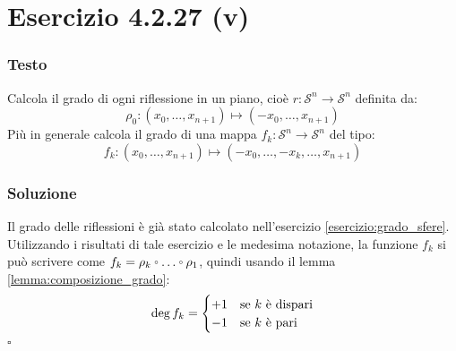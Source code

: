 \documentclass[10pt, toc=sectionentrywithdots]{scrartcl}
\newcommand{\Sph}[1][]{\mathcal{S}^#1}
\let\latexcirc=\circ
\newcommand{\ccirc}{\mathbin{\mathchoice
  {\xcirc\scriptstyle}
  {\xcirc\scriptstyle}
  {\xcirc\scriptscriptstyle}
  {\xcirc\scriptscriptstyle}
}}
\newcommand{\xcirc}[1]{\vcenter{\hbox{$#1\latexcirc$}}}
\let\circ\ccirc
\begin{document}
\section[4.2.27 (v)]{Esercizio 4.2.27 (v)}

\subsubsection*{Testo}
Calcola il grado di ogni riflessione in un piano, cioè $ r \colon \Sph{n} \to \Sph{n} $
definita da:
\[
  \rho_0 \colon (x_0, \dots, x_{n+1}) \mapsto (-x_0, \dots, x_{n+1})
\]
Più in generale calcola il grado di una mappa  $ f_k \colon \Sph{n} \to \Sph{n} $ del tipo:
\[
  f_k \colon (x_0, \dots, x_{n+1}) \mapsto (-x_0, \dots, -x_k, \dots, x_{n+1})
\]

\subsubsection*{Soluzione}

Il grado delle riflessioni è già stato calcolato nell'esercizio
\ref{esercizio:grado_sfere}. Utilizzando i risultati di tale esercizio e le
medesima notazione, la funzione $ f_k $ si può scrivere come
$ f_k = \rho_k \circ \dots \circ \rho_1 $, quindi usando il lemma \ref{lemma:composizione_grado}:
\[
  \deg {f_k} =
  \begin{cases}
    + 1 & \text{se $ k $ è dispari} \\
    - 1 & \text{se $ k $ è pari}
  \end{cases}
\]
\hfill $ \square $
\end{document}
